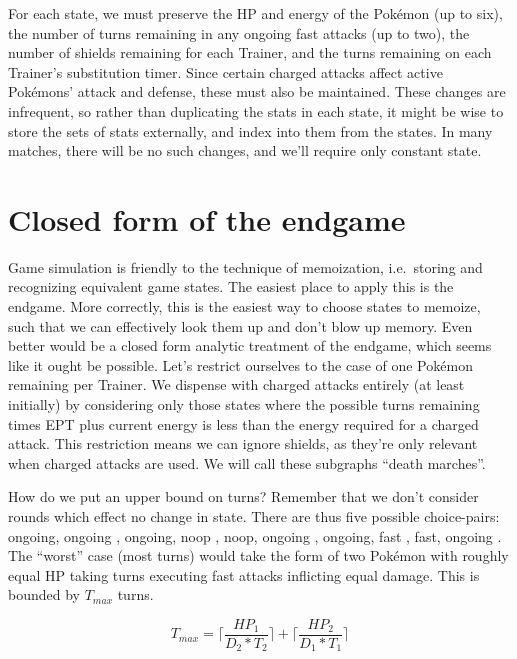 For each state, we must preserve the HP and energy of the Pokémon (up to six),
  the number of turns remaining in any ongoing fast attacks (up to two),
  the number of shields remaining for each Trainer,
  and the turns remaining on each Trainer's substitution timer.
Since certain charged attacks affect active Pokémons' attack and defense,
  these must also be maintained.
These changes are infrequent, so rather than duplicating the stats in
  each state, it might be wise to store the sets of stats externally,
  and index into them from the states.
In many matches, there will be no such changes, and we'll require
  only constant state.

\section{Closed form of the endgame}
Game simulation is friendly to the technique of memoization, i.e.\ storing
  and recognizing equivalent game states.
The easiest place to apply this is the endgame.
More correctly, this is the easiest way to choose states to memoize,
  such that we can effectively look them up and don't blow up memory.
Even better would be a closed form analytic treatment of the endgame,
  which seems like it ought be possible.
Let's restrict ourselves to the case of one Pokémon remaining per Trainer.
We dispense with charged attacks entirely (at least initially) by considering
  only those states where the possible turns remaining times EPT plus current
  energy is less than the energy required for a charged attack.
This restriction means we can ignore shields, as they're only relevant
  when charged attacks are used.
We will call these subgraphs ``death marches''.

How do we put an upper bound on turns?
Remember that we don't consider rounds which effect no change in state.
There are thus five possible choice-pairs:
  { ongoing, ongoing },
  { ongoing, noop },
  { noop, ongoing },
  { ongoing, fast },
  { fast, ongoing }.
The ``worst'' case (most turns) would take the form of two Pokémon
  with roughly equal HP taking turns executing fast attacks
  inflicting equal damage.
This is bounded by $T_{max}$ turns.

\[ T_{max} = \lceil\frac{HP_1}{D_2 * T_2}\rceil + \lceil\frac{HP_2}{D_1 * T_1}\rceil \]

